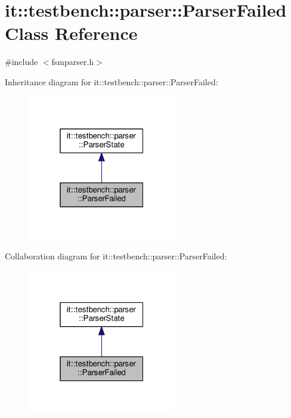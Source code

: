 \hypertarget{classit_1_1testbench_1_1parser_1_1ParserFailed}{\section{it\-:\-:testbench\-:\-:parser\-:\-:Parser\-Failed Class Reference}
\label{d3/d42/classit_1_1testbench_1_1parser_1_1ParserFailed}
}


{\ttfamily \#include $<$fsmparser.\-h$>$}



Inheritance diagram for it\-:\-:testbench\-:\-:parser\-:\-:Parser\-Failed\-:
\nopagebreak
\begin{figure}[H]
\begin{center}
\leavevmode
\includegraphics[width=184pt]{d1/d6b/classit_1_1testbench_1_1parser_1_1ParserFailed__inherit__graph}
\end{center}
\end{figure}


Collaboration diagram for it\-:\-:testbench\-:\-:parser\-:\-:Parser\-Failed\-:
\nopagebreak
\begin{figure}[H]
\begin{center}
\leavevmode
\includegraphics[width=184pt]{d6/d22/classit_1_1testbench_1_1parser_1_1ParserFailed__coll__graph}
\end{center}
\end{figure}
